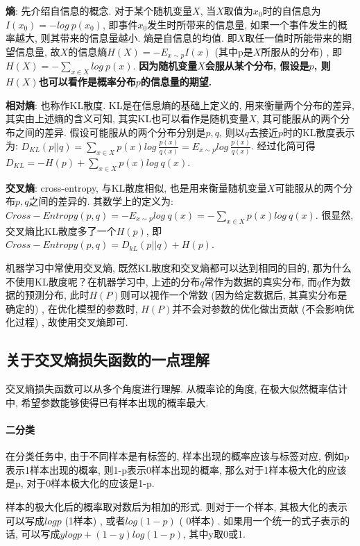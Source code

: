 \textbf{熵}: 先介绍自信息的概念. 对于某个随机变量$X$, 当$X$取值为$x_0$时的自信息为$I(x_0) = -log\ p(x_0)$, 即事件$x_0$发生时所带来的信息量, 如果一个事件发生的概率越大, 则其带来的信息量越小. 熵是自信息的均值. 即$X$取任一值时所能带来的期望信息量, 故$X$的信息熵$H(X) = -E_{x\sim p}I(x)$ (其中p是$X$所服从的分布) , 即$H(X) = -\sum_{x \in X}log\ p(x)$. \textbf{因为随机变量$X$会服从某个分布, 假设是$p$, 则$H(X)$也可以看作是概率分布$p$的信息量的期望. }

\textbf{相对熵}: 也称作KL散度. KL是在信息熵的基础上定义的, 用来衡量两个分布的差异, 其实由上述熵的含义可知, 其实KL也可以看作是随机变量$X$, 其可能服从的两个分布之间的差异. 假设可能服从的两个分布分别是$p, q$, 则以$q$去接近$p$时的KL散度表示为: $D_{KL}(p||q) = \sum_{x \in X} p(x) log\ \frac{p(x)}{q(x)} = E_{x\sim p} log\ \frac{p(x)}{q(x)}$. 经过化简可得$D_{KL} = -H(p) + \sum_{x \in X}p(x)log\ q(x)$. 

\textbf{交叉熵}: \label{ce}cross-entropy, 与KL散度相似, 也是用来衡量随机变量$X$可能服从的两个分布$p, q$之间的差异的. 其数学上的定义为: $Cross-Entropy(p, q) = -E_{x\sim p} log\ q(x) = - \sum_{x \in X}p(x)log\ q(x)$. 很显然, 交叉熵比KL散度多了一个$H(p)$, 即$Cross-Entropy(p, q) = D_{kL}(p || q) + H(p)$. 

机器学习中常使用交叉熵, 既然KL散度和交叉熵都可以达到相同的目的, 那为什么不使用KL散度呢？在机器学习中, 上述的分布$q$常作为数据的真实分布, 而$q$作为数据的预测分布, 此时$H(P)$则可以视作一个常数 (因为给定数据后, 其真实分布是确定的) , 在优化模型的参数时, $H(P)$并不会对参数的优化做出贡献 (不会影响优化过程) , 故使用交叉熵即可. 

\subsection{关于交叉熵损失函数的一点理解}
交叉熵损失函数可以从多个角度进行理解. 从概率论的角度, 在极大似然概率估计中, 希望参数能够使得已有样本出现的概率最大. 

\paragraph{二分类}
在分类任务中, 由于不同样本是有标签的, 样本出现的概率应该与标签对应, 例如p表示1样本出现的概率, 则1-p表示0样本出现的概率, 那么对于1样本极大化的应该是p, 对于0样本极大化的应该是1-p. 

样本的极大化后的概率取对数后为相加的形式. 则对于一个样本, 其极大化的表示可以写成$log p$  (1样本) , 或者$log(1-p)$ ( 0样本) . 如果用一个统一的式子表示的话, 可以写成$y log p + (1-y) log(1-p)$, 其中y取0或1. 

